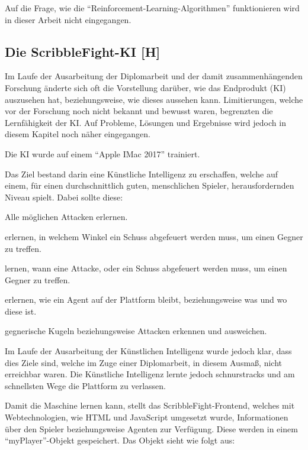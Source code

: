 Auf die Frage, wie die ``Reinforcement-Learning-Algorithmen'' funktionieren wird in dieser Arbeit nicht eingegangen.


\subsection{Die ScribbleFight-KI [H]}\label{maai:scribblefightki}

Im Laufe der Ausarbeitung der Diplomarbeit und der damit zusammenhängenden Forschung änderte sich oft die
Vorstellung darüber, wie das Endprodukt (KI) auszusehen hat, beziehungsweise, wie dieses aussehen kann.
Limitierungen, welche vor der Forschung noch nicht bekannt und bewusst waren, begrenzten die Lernfähigkeit der KI.
Auf Probleme, Lösungen und Ergebnisse wird jedoch in diesem Kapitel noch näher eingegangen.

Die KI wurde auf einem ``Apple IMac 2017'' trainiert.

Das Ziel bestand darin eine Künstliche Intelligenz zu erschaffen, welche auf einem, für einen durchschnittlich guten, menschlichen Spieler, herausfordernden Niveau spielt. Dabei sollte diese:
\begin{compactitem}
    \item Alle möglichen Attacken erlernen.
    \item erlernen, in welchem Winkel ein Schuss abgefeuert werden muss, um einen Gegner zu treffen.
    \item lernen, wann eine Attacke, oder ein Schuss abgefeuert werden muss, um einen Gegner zu treffen.
    \item erlernen, wie ein Agent auf der Plattform bleibt, beziehungsweise was und wo diese ist.
    \item gegnerische Kugeln beziehungsweise Attacken erkennen und ausweichen.
\end{compactitem}
Im Laufe der Ausarbeitung der Künstlichen Intelligenz wurde jedoch klar, dass dies Ziele sind, welche im Zuge einer Diplomarbeit, in diesem Ausmaß, nicht erreichbar waren. Die Künstliche Intelligenz lernte jedoch schnurstracks und am schnellsten Wege die Plattform zu verlassen.

Damit die Maschine lernen kann, stellt das ScribbleFight-Frontend, welches mit Webtechnologien, wie HTML und JavaScript umgesetzt wurde, Informationen über den Spieler beziehungsweise Agenten zur Verfügung. Diese werden in einem ``myPlayer''-Objekt gespeichert. Das Objekt sieht wie folgt aus:


